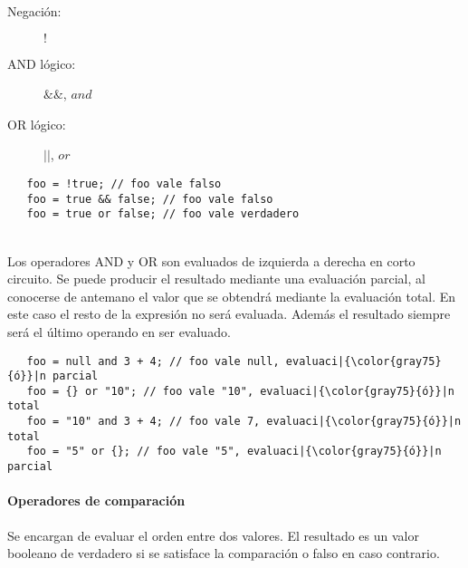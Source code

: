 \begin{description}
\item [Negación:] $!$
\item [AND lógico:] $\&\&$, $and$
\item [OR lógico:] $||$, $or$
\end{description} 

\begin{lstlisting}
   foo = !true; // foo vale falso
   foo = true && false; // foo vale falso
   foo = true or false; // foo vale verdadero
\end{lstlisting} 
\hfill\\

Los operadores AND y OR son evaluados de izquierda a derecha en corto circuito. Se puede producir el resultado mediante una evaluación parcial, al conocerse de antemano el 
valor que se obtendrá mediante la evaluación total. En este caso el resto de la expresión no será evaluada. Además el resultado siempre será el último operando en ser evaluado. \\
 
\begin{lstlisting}
   foo = null and 3 + 4; // foo vale null, evaluaci|{\color{gray75}{ó}}|n parcial 
   foo = {} or "10"; // foo vale "10", evaluaci|{\color{gray75}{ó}}|n total
   foo = "10" and 3 + 4; // foo vale 7, evaluaci|{\color{gray75}{ó}}|n total
   foo = "5" or {}; // foo vale "5", evaluaci|{\color{gray75}{ó}}|n parcial
\end{lstlisting} 



\paragraph{Operadores de comparación}\label{sec:op_cmp}
Se encargan de evaluar el orden entre dos valores. El resultado es un valor booleano de verdadero si se satisface la comparación o falso en caso contrario.

